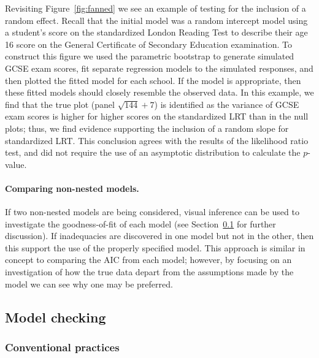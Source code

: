 \documentclass{article} %
\begin{document}
Revisiting Figure~\ref{fig:fanned} we see an example of testing for the inclusion of a random effect. Recall that the initial model was a random intercept model using a student's score on the standardized London Reading Test to describe their age 16 score on the General Certificate of Secondary Education examination. To construct this figure we used the parametric bootstrap to generate simulated GCSE exam scores, fit separate regression models to the simulated responses, and then plotted the fitted model for each school. If the model is appropriate, then these fitted models should closely resemble the observed data. In this example, we find that the true plot (panel $\sqrt{144} + 7$) is identified as the variance of GCSE exam scores is higher for higher scores on the standardized LRT than in the null plots; thus, we find evidence supporting the inclusion of a random slope for standardized LRT. This conclusion agrees with the results of the likelihood ratio test, and did not require the use of an asymptotic distribution to calculate the $p$-value.


\paragraph{Comparing non-nested models.}
If two non-nested models are being considered, visual inference can be used to investigate the goodness-of-fit of each model (see Section~\ref{sec:checking} for further discussion). If inadequacies are discovered in one model but not in the other, then this support the use of the properly specified model. This approach is similar in concept to comparing the AIC from each model; however, by focusing on an investigation of how the true data depart from the assumptions made by the model we can see why one may be preferred.


\subsection{Model checking}\label{sec:checking}

\subsubsection{Conventional practices}
\end{document}
